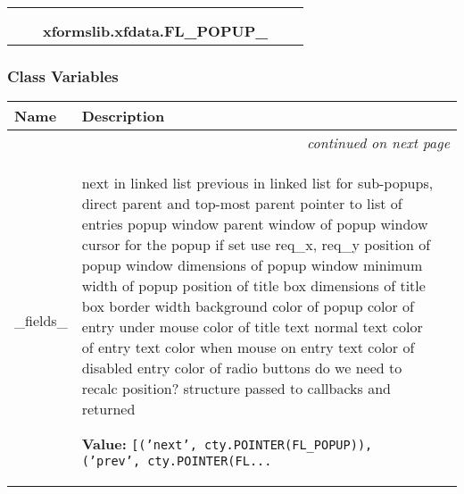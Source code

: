     \label{xformslib:xfdata:FL_POPUP_}
\begin{tabular}{cccccc}
\multicolumn{2}{r}{\settowidth{\BCL}{ctypes.Structure}\multirow{2}{\BCL}{ctypes.Structure}}
&&
  \\\cline{3-3}
  &&\multicolumn{1}{c|}{}
&&
  \\
&&\multicolumn{2}{l}{\textbf{xformslib.xfdata.FL\_POPUP\_}}
\end{tabular}



  \subsubsection{Class Variables}

    \vspace{-1cm}
\hspace{\varindent}\begin{longtable}{|p{\varnamewidth}|p{\vardescrwidth}|l}
\cline{1-2}
\cline{1-2} \centering \textbf{Name} & \centering \textbf{Description}& \\
\cline{1-2}
\endhead\cline{1-2}\multicolumn{3}{r}{\small\textit{continued on next page}}\\\endfoot\cline{1-2}
\endlastfoot\raggedright \_\-f\-i\-e\-l\-d\-s\-\_\- & \raggedright next in linked list
previous in linked list
for sub-popups, direct parent
and top-most parent
pointer to list of entries
popup window
parent window of popup window
cursor for the popup
if set use req\_x, req\_y
position of popup window
dimensions of popup window
minimum width of popup
position of title box
dimensions of title box
border width
background color of popup
color of entry under mouse
color of title text
normal text color of entry
text color when mouse on entry
text color of disabled entry
color of radio buttons
do we need to recalc position?
structure passed to callbacks and returned

\textbf{Value:} 
{\tt [('next', cty.POINTER(FL\_POPUP)), ('prev', cty.POINTER(FL\texttt{...}}&\\
\cline{1-2}
\end{longtable}


